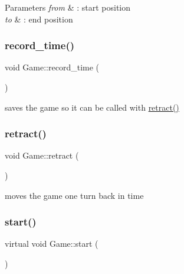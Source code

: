 \begin{DoxyParams}{Parameters}
{\em from} & \+: start position \\
\hline
{\em to} & \+: end position \\
\hline
\end{DoxyParams}
\mbox{\label{class_game_accc03cc11af1ef5614a265d2e9ed4841}} 
\subsubsection{\texorpdfstring{record\+\_\+time()}{record\_time()}}
{\footnotesize\ttfamily void Game\+::record\+\_\+time (\begin{DoxyParamCaption}{ }\end{DoxyParamCaption})}



saves the game so it can be called with \hyperlink{class_game_a9be0655102af94f1a37a7eaec1be36fc}{retract()} 

\mbox{\label{class_game_a9be0655102af94f1a37a7eaec1be36fc}} 
\subsubsection{\texorpdfstring{retract()}{retract()}}
{\footnotesize\ttfamily void Game\+::retract (\begin{DoxyParamCaption}{ }\end{DoxyParamCaption})}



moves the game one turn back in time 

\mbox{\label{class_game_add988158041df85337995e36f06756aa}} 
\subsubsection{\texorpdfstring{start()}{start()}}
{\footnotesize\ttfamily virtual void Game\+::start (\begin{DoxyParamCaption}{ }\end{DoxyParamCaption})\hspace{0.3cm}{\ttfamily [pure virtual]}}



